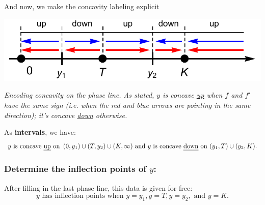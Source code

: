 \documentclass[12pt]{article}
\theoremstyle{definition}
\theoremstyle{underl}
\newcommand{\capt}[1]{\begin{adjustwidth}{0.5in}{0.5in}\centering\small\textit{#1}\end{adjustwidth}}
\begin{document}
	\noindent And now, we make the concavity labeling explicit
	\begin{center}
		\includegraphics[align=c,scale=0.875]{Ex2_Phase_5}
		\vspace{1.5mm}
		\capt{Encoding concavity on the phase line. As stated, $y$ is concave \ul{up} when $f$ and $f'$ have the same sign (i.e. when the red and blue arrows are pointing in the same direction); it's concave \ul{down} otherwise.}
	\end{center}
	As \textbf{intervals}, we have:
	$$y\text{ is concave \ul{up} on }\left(0,y_1\right)\cup(T,y_2)\cup(K,\infty)\text{ and }y\text{ is concave \ul{down} on }(y_1,T)\cup(y_2,K).$$
	
	\vspace{6mm}
	\subsubsection*{Determine the inflection points of $y$:}\par
	After filling in the last phase line, this data is given for free:
	$$y\text{ has inflection points when }y=y_1, y=T, y=y_2,\text{ and }y=K.$$
\end{document}
